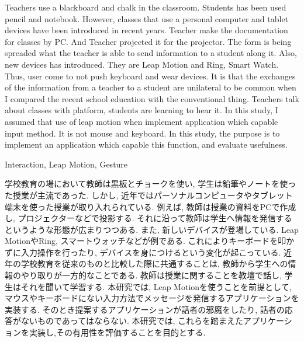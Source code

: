 \documentclass{funthesis}
\begin{document}
\maketitle       %

\begin{eabstract}
Teachers use a blackboard and chalk in the classroom. Students has been used pencil and notebook. However, classes that use a personal computer and tablet devices have been introduced in recent years. Teacher make the documentation for classes by PC. And Teacher projected it for the projector. The form is being spreaded what the teacher is able to send information to a student along it. Also, new devices has introduced. They are Leap Motion and Ring, Smart Watch. Thus, user come to  not push keyboard and wear devices. It is that the exchanges of the information from a teacher to a student are unilateral to be common when I compared the recent school education with the conventional thing. Teachers talk about classes with platform, students are learning to hear it. In this study, I assumed that use of leap motion when implement application which capable input method. It is not mouse and keyboard. In this study, the purpose is to implement an application which capable this function, and evaluate usefulness.
\end{eabstract}

\begin{ekeyword}
Interaction, Leap Motion, Gesture
\end{ekeyword}

\begin{jabstract}
学校教育の場において教師は黒板とチョークを使い, 学生は鉛筆やノートを使った授業が主流であった. しかし, 近年ではパーソナルコンピュータやタブレット端末を使った授業が取り入れられている. 例えば, 教師は授業の資料をPCで作成し, プロジェクターなどで投影する. それに沿って教師は学生へ情報を発信するというような形態が広まりつつある.  また, 新しいデバイスが登場している. Leap MotionやRing, スマートウォッチなどが例である. これによりキーボードを叩かずに入力操作を行ったり, デバイスを身につけるという変化が起こっている. 近年の学校教育を従来のものと比較した際に共通することは, 教師から学生への情報のやり取りが一方的なことである. 教師は授業に関することを教壇で話し, 学生はそれを聞いて学習する. 本研究では, Leap Motionを使うことを前提として, マウスやキーボードにない入力方法でメッセージを発信するアプリケーションを実装する. そのとき提案するアプリケーションが話者の邪魔をしたり, 話者の応答がないものであってはならない. 本研究では, これらを踏まえたアプリケーションを実装し,その有用性を評価することを目的とする. 

\end{jabstract}
\end{document}
